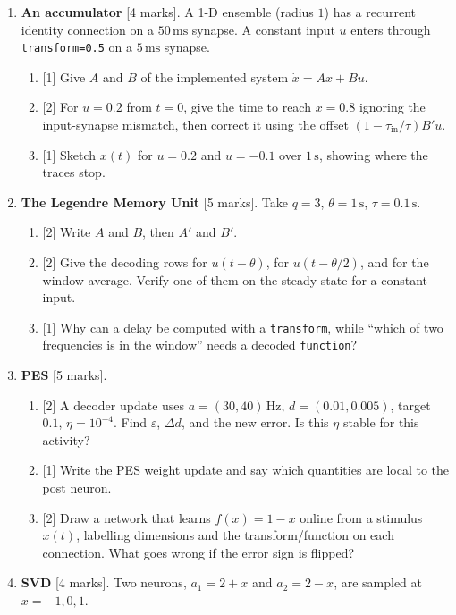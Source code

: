 \documentclass[11pt,letterpaper]{article}
\newcommand{\tin}{\tau_{\mathrm{in}}}
\begin{document}
\begin{enumerate}
\item \textbf{An accumulator} [4 marks]. A 1-D ensemble (radius $1$) has a recurrent identity connection on a $50\,\mathrm{ms}$ synapse. A constant input $u$ enters through \texttt{transform=0.5} on a $5\,\mathrm{ms}$ synapse.
\begin{enumerate}[label=(\alph*)]
\item {}[1] Give $A$ and $B$ of the implemented system $\dot x = Ax + Bu$.
\item {}[2] For $u = 0.2$ from $t = 0$, give the time to reach $x = 0.8$ ignoring the input-synapse mismatch, then correct it using the offset $(1 - \tin/\tau)B'u$.
\item {}[1] Sketch $x(t)$ for $u = 0.2$ and $u = -0.1$ over $1\,\mathrm{s}$, showing where the traces stop.
\end{enumerate}
\item \textbf{The Legendre Memory Unit} [5 marks]. Take $q = 3$, $\theta = 1\,\mathrm{s}$, $\tau = 0.1\,\mathrm{s}$.
\begin{enumerate}[label=(\alph*)]
\item {}[2] Write $A$ and $B$, then $A'$ and $B'$.
\item {}[2] Give the decoding rows for $u(t - \theta)$, for $u(t - \theta/2)$, and for the window average. Verify one of them on the steady state for a constant input.
\item {}[1] Why can a delay be computed with a \texttt{transform}, while ``which of two frequencies is in the window'' needs a decoded \texttt{function}?
\end{enumerate}
\item \textbf{PES} [5 marks].
\begin{enumerate}[label=(\alph*)]
\item {}[2] A decoder update uses $a = (30, 40)\,\mathrm{Hz}$, $d = (0.01, 0.005)$, target $0.1$, $\eta = 10^{-4}$. Find $\varepsilon$, $\Delta d$, and the new error. Is this $\eta$ stable for this activity?
\item {}[1] Write the PES weight update and say which quantities are local to the post neuron.
\item {}[2] Draw a network that learns $f(x) = 1 - x$ online from a stimulus $x(t)$, labelling dimensions and the transform/function on each connection. What goes wrong if the error sign is flipped?
\end{enumerate}
\item \textbf{SVD} [4 marks]. Two neurons, $a_1 = 2 + x$ and $a_2 = 2 - x$, are sampled at $x = -1, 0, 1$.

\end{enumerate}
\end{document}
